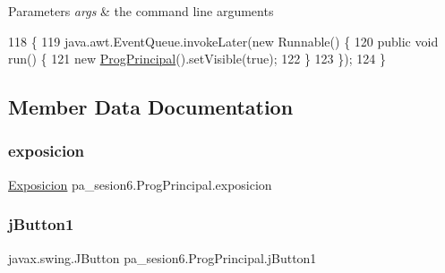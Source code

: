 \begin{DoxyParams}{Parameters}
{\em args} & the command line arguments \\
\hline
\end{DoxyParams}

\begin{DoxyCode}
118     \{
119         java.awt.EventQueue.invokeLater(\textcolor{keyword}{new} Runnable() \{
120             \textcolor{keyword}{public} \textcolor{keywordtype}{void} run() \{
121                 \textcolor{keyword}{new} \mbox{\hyperlink{classpa__sesion6_1_1_prog_principal_a9df4d17bd1c700512b0f59e19c45edac}{ProgPrincipal}}().setVisible(\textcolor{keyword}{true});
122             \}
123         \});
124     \}
\end{DoxyCode}


\subsection{Member Data Documentation}
\mbox{\label{classpa__sesion6_1_1_prog_principal_a1287569c58f606024f2dc4216a267f9e}} 
\subsubsection{\texorpdfstring{exposicion}{exposicion}}
{\footnotesize\ttfamily \mbox{\hyperlink{classpa__sesion6_1_1_exposicion}{Exposicion}} pa\+\_\+sesion6.\+Prog\+Principal.\+exposicion\hspace{0.3cm}{\ttfamily [package]}}

\mbox{\label{classpa__sesion6_1_1_prog_principal_ac3fa4d920e564a95291a07710b145455}} 
\subsubsection{\texorpdfstring{j\+Button1}{jButton1}}
{\footnotesize\ttfamily javax.\+swing.\+J\+Button pa\+\_\+sesion6.\+Prog\+Principal.\+j\+Button1\hspace{0.3cm}{\ttfamily [private]}}

